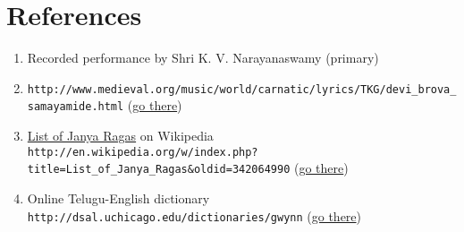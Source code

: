 \documentclass[12pt]{article}
\def \netref#1{{\scriptsize {\tt #1} (\href{#1}{go there})}}
\begin{document}
 
\section*{References}
\begin{enumerate}
\item Recorded performance by Shri K. V. Narayanaswamy (primary)
\item {\scriptsize \verb|http://www.medieval.org/music/world/carnatic/lyrics/TKG/devi_brova_samayamide.html| (\href{http://www.medieval.org/music/world/carnatic/lyrics/TKG/devi_brova_samayamide.html}{go there})}
\item \href{http://en.wikipedia.org/wiki/List_of_Janya_Ragas}{List of Janya Ragas} on Wikipedia\\
{\scriptsize \verb|http://en.wikipedia.org/w/index.php?title=List_of_Janya_Ragas&oldid=342064990|  (\href{http://en.wikipedia.org/w/index.php?title=List\_of\_Janya_Ragas&oldid=342064990}{go there})}
\item Online Telugu-English dictionary\\ \netref{http://dsal.uchicago.edu/dictionaries/gwynn}
\end{enumerate}
\end{document}
